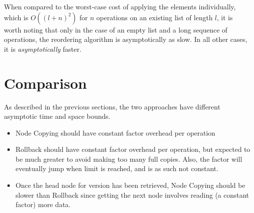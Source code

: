 When compared to the worst-case cost of applying the elements individually,
which is $O\left(\left(l+n\right)^2\right)$ for $n$ operations on an existing
list of length $l$, it is worth noting that only in the case of an empty list
and a long sequence of operations, the reordering algorithm is asymptotically as
slow. In all other cases, it is \emph{asymptotically} faster.

\section{Comparison}
As described in the previous sections, the two approaches have different
asymptotic time and space bounds. 

\begin{itemize}

  \item Node Copying should have constant factor overhead per operation

  \item Rollback should have constant factor overhead per operation, but
  expected to be much greater to avoid making too many full copies. Also, the
  factor will eventually jump when limit is reached, and is as such not
  constant.

  \item Once the head node for version has been retrieved, Node Copying should
  be slower than Rollback since getting the next node involves reading (a
  constant factor) more data.
\end{itemize}

